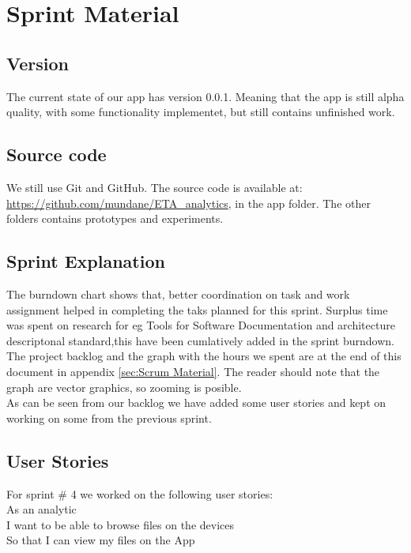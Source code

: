\section{Sprint Material} %
\label{sec:Sprint Material}
\subsection{Version} %
\label{sub:Version}
The current state of our app has version 0.0.1. Meaning that the app is still alpha quality, with some functionality implementet, but still contains unfinished work.
\subsection{Source code} %
\label{sub:Source code}
We still use Git and GitHub. The source code is available at: \url{https://github.com/mundane/ETA_analytics}, in the app folder. The other folders contains prototypes and experiments.
\subsection{Sprint Explanation}
The burndown chart shows that, better coordination on task and work assignment helped in completing the taks planned for this sprint.
Surplus time was spent on research for eg Tools for Software Documentation and architecture descriptonal standard,this have been cumlatively added in the sprint burndown.
The project backlog and the graph with the hours we spent are at the end of this document in appendix \ref{sec:Scrum Material}. The reader should note that the graph are vector graphics, so zooming is posible. \\
As can be seen from our backlog we have added some user stories and kept on working on some from the previous sprint.
\subsection{User Stories}
For sprint \# 4 we worked on the following user stories: \\

As an analytic \\
I want to be able to browse files on the devices\\
So that I can view my files on the App \\

